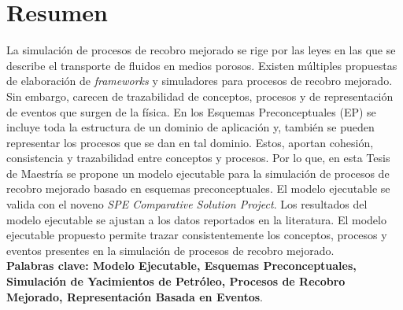 \newpage{\pagestyle{empty}\cleardoublepage}

\chapter*{Resumen}

La simulación de procesos de recobro mejorado se rige por las leyes en las que se describe el transporte de fluidos en medios porosos. Existen múltiples propuestas de elaboración de \textit{frameworks} y simuladores para procesos de recobro mejorado. Sin embargo, carecen de trazabilidad de conceptos, procesos y de representación de eventos que surgen de la física. En los Esquemas Preconceptuales (EP) se incluye toda la estructura de un dominio de aplicación y, también se pueden representar los procesos que se dan en tal dominio. Estos, aportan cohesión, consistencia y trazabilidad entre conceptos y procesos. Por lo que, en esta Tesis de Maestría se propone un modelo ejecutable para la simulación de procesos de recobro mejorado basado en esquemas preconceptuales. El modelo ejecutable se valida con el noveno \textit{SPE Comparative Solution Project}. Los resultados del modelo ejecutable se ajustan a los datos reportados en la literatura. El modelo ejecutable propuesto permite trazar consistentemente los conceptos, procesos y eventos presentes en la simulación de procesos de recobro mejorado.\\


\textbf{\small Palabras clave: Modelo Ejecutable, Esquemas Preconceptuales, Simulación de Yacimientos de Petróleo, Procesos de Recobro Mejorado, Representación Basada en Eventos}.\\




